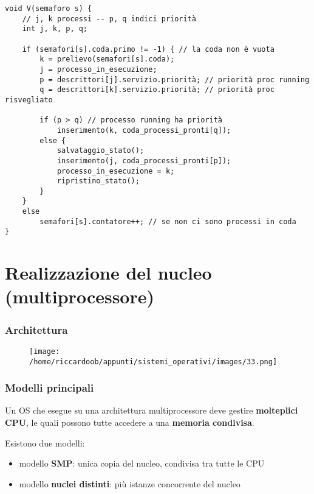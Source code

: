 \begin{verbatim}
void V(semaforo s) {
    // j, k processi -- p, q indici priorità
    int j, k, p, q;
    
    if (semafori[s].coda.primo != -1) { // la coda non è vuota
        k = prelievo(semafori[s].coda);
        j = processo_in_esecuzione;
        p = descrittori[j].servizio.priorità; // priorità proc running
        q = descrittori[k].servizio.priorità; // priorità proc risvegliato

        if (p > q) // processo running ha priorità
            inserimento(k, coda_processi_pronti[q]);
        else {
            salvataggio_stato();
            inserimento(j, coda_processi_pronti[p]);
            processo_in_esecuzione = k;
            ripristino_stato();
        }
    }
    else
        semafori[s].contatore++; // se non ci sono processi in coda
}           
\end{verbatim}

\section{Realizzazione del nucleo (multiprocessore)}

\subsubsection{Architettura}
\begin{figure}[H]
    \centering
    \texttt{[image: /home/riccardoob/appunti/sistemi\_operativi/images/33.png]}
\end{figure}

\subsubsection{Modelli principali}
Un OS che esegue su una architettura multiprocessore deve gestire \textbf{molteplici CPU}, le quali possono tutte accedere a una \textbf{memoria condivisa}.

Esistono due modelli:
\begin{itemize}
    \item modello \textbf{SMP}: unica copia del nucleo, condivisa tra tutte le CPU
    \item modello \textbf{nuclei distinti}: più istanze concorrente del nucleo
\end{itemize}

